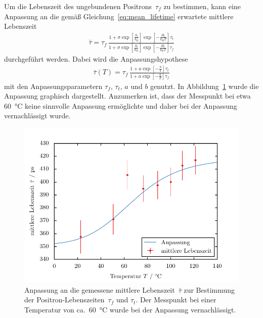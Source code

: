 \documentclass[11pt, a4paper]{article}
\numberwithin{equation}{section}
\begin{document}
Um die Lebenszeit des ungebundenen Positrons~$\tau_f$ zu bestimmen, kann eine Anpassung an die gemäß Gleichung~\eqref{eq:mean_lifetime} erwartete mittlere Lebenszeit 
\begin{align*}
	\bar{\tau} = \tau_f \, \frac{1 + \sigma \exp\left[ \frac{S_t}{k_\mathrm{B}} \right] \exp\left[ -\frac{H_t}{k_\mathrm{B} T} \right] \tau_t}{1 + \sigma \exp\left[ \frac{S_t}{k_\mathrm{B}} \right] \exp\left[ -\frac{H_t}{k_\mathrm{B} T} \right] \tau_f}
\end{align*}
durchgeführt werden.
Dabei wird die Anpassungshypothese
\begin{align*}
	\bar{\tau}(T) = \tau_f \, \frac{1 + a \exp\left[ -\frac{b}{T} \right] \tau_t}{1 + a \exp\left[ -\frac{b}{T} \right] \tau_f}
\end{align*}
mit den Anpassungsparametern $\tau_f$, $\tau_t$, $a$ und $b$ genutzt.
In Abbildung~\ref{fig:s_curve} wurde die Anpassung graphisch dargestellt.
Anzumerken ist, dass der Messpunkt bei etwa \SI{60}{\degreeCelsius} keine sinnvolle Anpassung ermöglichte und daher bei der Anpassung vernachlässigt wurde.
\begin{figure}[h]
	\centering
	\includegraphics{./figures/lifetime_s_curve.pdf}
	\caption{Anpassung an die gemessene mittlere Lebenszeit~$\bar{\tau}$ zur Bestimmung der Positron-Lebenszeiten~$\tau_f$ und $\tau_t$.
		     Der Messpunkt bei einer Temperatur von ca.\ \SI{60}{\degreeCelsius} wurde bei der Anpassung vernachlässigt.}
	\label{fig:s_curve}
\end{figure}
\end{document}
